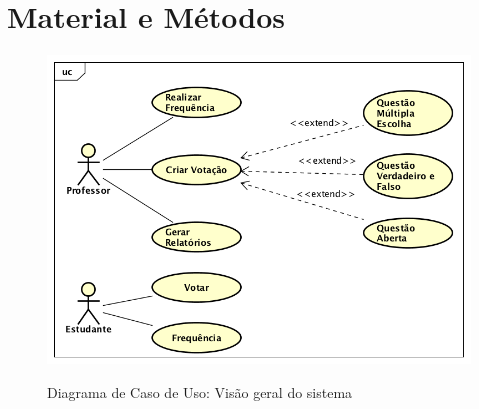 \chapter{Material e Métodos}

\begin{figure}[!htb]
  \centering
  \caption{Diagrama de Caso de Uso: Visão geral do sistema}
  \includegraphics[width=.75\textwidth]{imagens/casodeuso}
  \label{fig:desenv_preco}
\end{figure}
